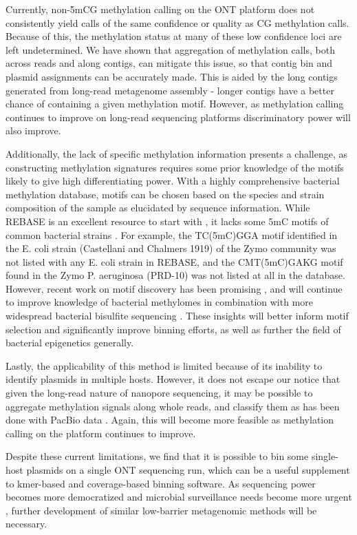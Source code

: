 Currently, non-5mCG methylation calling on the ONT platform does not consistently yield calls of the same confidence or quality as CG methylation calls. Because of this, the methylation status at many of these low confidence loci are left undetermined. We have shown that aggregation of methylation calls, both across reads and along contigs, can mitigate this issue, so that contig bin and plasmid assignments can be accurately made. This is aided by the long contigs generated from long-read metagenome assembly - longer contigs have a better chance of containing a given methylation motif. However, as methylation calling continues to improve on long-read sequencing platforms discriminatory power will also improve.

Additionally, the lack of specific methylation information presents a challenge, as constructing methylation signatures requires some prior knowledge of the motifs likely to give high differentiating power. With a highly comprehensive bacterial methylation database, motifs can be chosen based on the species and strain composition of the sample as elucidated by sequence information. While REBASE is an excellent resource to start with \citep{Roberts2003-ss}, it lacks some 5mC motifs of common bacterial strains \citep{Tourancheau2021-hv}. For example, the TC(5mC)GGA motif identified in the E. coli strain (Castellani and Chalmers 1919) of the Zymo community was not listed with any E. coli strain in REBASE, and the CMT(5mC)GAKG motif found in the Zymo P. aeruginosa (PRD-10) was not listed at all in the database. However, recent work on motif discovery has been promising \citep{Tourancheau2021-hv, Beaulaurier2018-mu}, and will continue to improve knowledge of bacterial methylomes in combination with more widespread bacterial bisulfite sequencing \citep{Oliveira_Pedro_H2021-rs}. These insights will better inform motif selection and significantly improve binning efforts, as well as further the field of bacterial epigenetics generally.

Lastly, the applicability of this method is limited because of its inability to identify plasmids in multiple hosts. However, it does not escape our notice that given the long-read nature of nanopore sequencing, it may be possible to aggregate methylation signals along whole reads, and classify them as has been done with PacBio data \citep{Beaulaurier2018-mu}. Again, this will become more feasible as methylation calling on the platform continues to improve.

Despite these current limitations, we find that it is possible to bin some single-host plasmids on a single ONT sequencing run, which can be a useful supplement to kmer-based and coverage-based binning software. As sequencing power becomes more democratized and microbial surveillance needs become more urgent \citep{Iskandar2021-eg}, further development of similar low-barrier metagenomic methods will be necessary.


